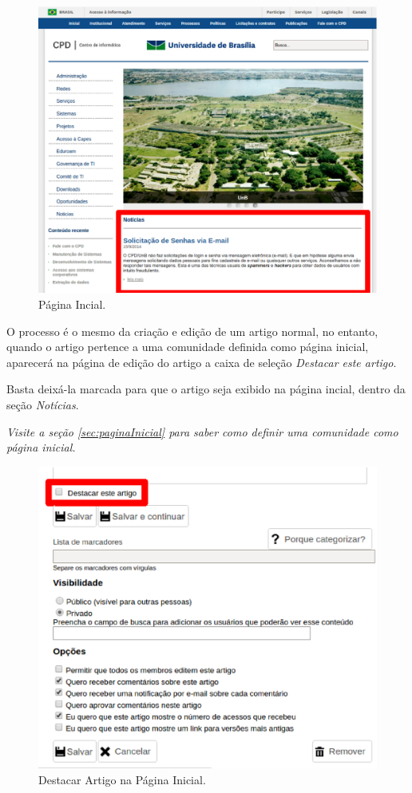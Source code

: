 \begin{figure}[h]
     \centering
       \includegraphics[keepaspectratio=true,scale=0.5]{figuras/noticias.eps}
     \caption{Página Incial.}
     \label{fig:homeNoticias}
\end{figure}

\newpage
O processo é o mesmo da criação e edição de um artigo normal, no entanto, quando o artigo pertence a uma comunidade definida como página inicial, aparecerá na página de edição do artigo a caixa de seleção \emph{\color{red}Destacar este artigo}.

Basta deixá-la marcada para que o artigo seja exibido na página incial, dentro da seção \emph{Notícias}.

\emph{Visite a seção \ref{sec:paginaInicial} para saber como definir uma comunidade como página inicial.}

\begin{figure}[H]
  \centering
    \includegraphics[keepaspectratio=true,scale=0.49]{figuras/destacarArtigo.eps}
  \caption{Destacar Artigo na Página Inicial.}
  \label{fig:destacarArtigo}
\end{figure}

